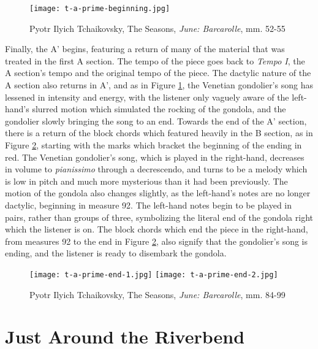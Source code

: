 \begin{figure}[h]
  \centering
  \texttt{[image: t-a-prime-beginning.jpg]}
  \caption{Pyotr Ilyich Tchaikovsky, The Seasons, \textit{June: Barcarolle}, mm. 52-55}
  \label{fig:t-a-prime-beginning}
\end{figure}


Finally, the A' begins, featuring a return of many of the material that was treated in the first A section. The tempo of the piece goes back to \textit{Tempo I}, the A section's tempo and the original tempo of the piece. The dactylic nature of the A section also returns in A', and as in Figure \ref{fig:t-a-prime-beginning}\autocite{Henle_2002}, the Venetian gondolier's song has lessened in intensity and energy, with the listener only vaguely aware of the left-hand's slurred motion which simulated the rocking of the gondola, and the gondolier slowly bringing the song to an end. Towards the end of the A' section, there is a return of the block chords which featured heavily in the B section, as in Figure \ref{fig:t-a-prime-ending}\autocite{Henle_2002}, starting with the marks which bracket the beginning of the ending in red. The Venetian gondolier's song, which is played in the right-hand, decreases in volume to \textit{pianissimo} through a decrescendo, and turns to be a melody which is low in pitch and much more mysterious than it had been previously. The motion of the gondola also changes slightly, as the left-hand's notes are no longer dactylic, beginning in measure 92. The left-hand notes begin to be played in pairs, rather than groups of three, symbolizing the literal end of the gondola right which the listener is on. The block chords which end the piece in the right-hand, from measures 92 to the end in Figure \ref{fig:t-a-prime-ending}\autocite{Henle_2002}, also signify that the gondolier's song is ending, and the listener is ready to disembark the gondola.

\begin{figure}
  \centering
  \texttt{[image: t-a-prime-end-1.jpg]}
  \texttt{[image: t-a-prime-end-2.jpg]}
  \caption{Pyotr Ilyich Tchaikovsky, The Seasons, \textit{June: Barcarolle}, mm. 84-99}
  \label{fig:t-a-prime-ending}
\end{figure}

\section{Just Around the Riverbend}

